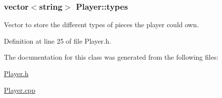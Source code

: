 \hypertarget{classPlayer_a05f23ead572f763fedd4488d6a82b822}{
\subsubsection[{types}]{\setlength{\rightskip}{0pt plus 5cm}vector$<$string$>$ Player\-::types\hspace{0.3cm}{\ttfamily [protected]}}}\label{classPlayer_a05f23ead572f763fedd4488d6a82b822}


Vector to store the different types of pieces the player could own. 



Definition at line 25 of file Player.\-h.



The documentation for this class was generated from the following files\-:\begin{DoxyCompactItemize}
\item 
\hyperlink{Player_8h}{Player.\-h}\item 
\hyperlink{Player_8cpp}{Player.\-cpp}\end{DoxyCompactItemize}
